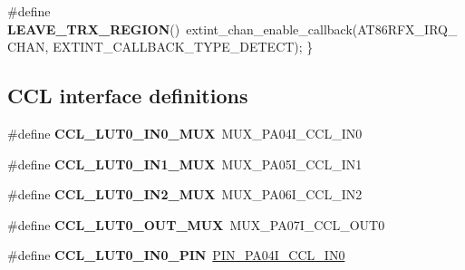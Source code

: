 \begin{DoxyCompactItemize}
\item 
\hypertarget{group__saml21__xplained__pro__features__group_ga4d42dd2c017ace613e800d6f7e8694bc}{}\#define {\bfseries L\+E\+A\+V\+E\+\_\+\+T\+R\+X\+\_\+\+R\+E\+G\+I\+O\+N}()~extint\+\_\+chan\+\_\+enable\+\_\+callback(A\+T86\+R\+F\+X\+\_\+\+I\+R\+Q\+\_\+\+C\+H\+A\+N, E\+X\+T\+I\+N\+T\+\_\+\+C\+A\+L\+L\+B\+A\+C\+K\+\_\+\+T\+Y\+P\+E\+\_\+\+D\+E\+T\+E\+C\+T); \}\label{group__saml21__xplained__pro__features__group_ga4d42dd2c017ace613e800d6f7e8694bc}

\end{DoxyCompactItemize}
\subsection*{C\+C\+L interface definitions}
\begin{DoxyCompactItemize}
\item 
\hypertarget{group__saml21__xplained__pro__features__group_ga039571d16d1fde8d573b816706cdd6ea}{}\#define {\bfseries C\+C\+L\+\_\+\+L\+U\+T0\+\_\+\+I\+N0\+\_\+\+M\+U\+X}~M\+U\+X\+\_\+\+P\+A04\+I\+\_\+\+C\+C\+L\+\_\+\+I\+N0\label{group__saml21__xplained__pro__features__group_ga039571d16d1fde8d573b816706cdd6ea}

\item 
\hypertarget{group__saml21__xplained__pro__features__group_ga0c3abc03aeb01d5d10e980ea02a7ee4f}{}\#define {\bfseries C\+C\+L\+\_\+\+L\+U\+T0\+\_\+\+I\+N1\+\_\+\+M\+U\+X}~M\+U\+X\+\_\+\+P\+A05\+I\+\_\+\+C\+C\+L\+\_\+\+I\+N1\label{group__saml21__xplained__pro__features__group_ga0c3abc03aeb01d5d10e980ea02a7ee4f}

\item 
\hypertarget{group__saml21__xplained__pro__features__group_gaa27768c9ecac16ceeb7a738a554cf940}{}\#define {\bfseries C\+C\+L\+\_\+\+L\+U\+T0\+\_\+\+I\+N2\+\_\+\+M\+U\+X}~M\+U\+X\+\_\+\+P\+A06\+I\+\_\+\+C\+C\+L\+\_\+\+I\+N2\label{group__saml21__xplained__pro__features__group_gaa27768c9ecac16ceeb7a738a554cf940}

\item 
\hypertarget{group__saml21__xplained__pro__features__group_gaaaaa2777a97b081659399ccb0572434a}{}\#define {\bfseries C\+C\+L\+\_\+\+L\+U\+T0\+\_\+\+O\+U\+T\+\_\+\+M\+U\+X}~M\+U\+X\+\_\+\+P\+A07\+I\+\_\+\+C\+C\+L\+\_\+\+O\+U\+T0\label{group__saml21__xplained__pro__features__group_gaaaaa2777a97b081659399ccb0572434a}

\item 
\hypertarget{group__saml21__xplained__pro__features__group_gaced44baec8cb2bfe1edc10282379b4ae}{}\#define {\bfseries C\+C\+L\+\_\+\+L\+U\+T0\+\_\+\+I\+N0\+\_\+\+P\+I\+N}~\hyperlink{pio_2saml21j18a_8h_a71566969e2fb39405dccda3390b47135}{P\+I\+N\+\_\+\+P\+A04\+I\+\_\+\+C\+C\+L\+\_\+\+I\+N0}\label{group__saml21__xplained__pro__features__group_gaced44baec8cb2bfe1edc10282379b4ae}


\end{DoxyCompactItemize}
